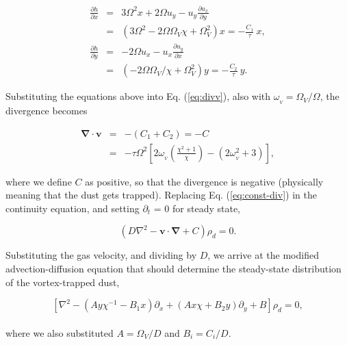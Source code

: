 \documentclass[apj]{emulateapj}
\newcommand{\pderiv}[2]{\frac{\partial #1}{\partial #2}}
\newcommand{\pderivn}[3]{\frac{\partial^{#3} #1}{\partial #2^{#3}}}
\renewcommand{\v}[1]{{\boldsymbol{#1}}} %
\newcommand{\del}{\v{\nabla}}
\newcommand{\Div}{\del\cdot}
\newcommand{\Laplace}{\nabla^2}
\newcommand{\Eq}[1]{Eq. (\ref{#1})}
\newcommand{\eq}[1]{\Eq{#1}}
\newcommand{\beq}{\begin{equation}}
\newcommand{\eeq}{\end{equation}}
\newcommand{\beqn}{\begin{eqnarray}}
\newcommand{\eeqn}{\end{eqnarray}}
\begin{document}
\begin{eqnarray}
\pderiv{h}{x} &=& 3\varOmega^2 x + 2\varOmega u_y -
u_y\pderiv{u_x}{y} \nonumber \\
&=& \left(3\varOmega^2 - 2\Omega\Omega_V \chi + \varOmega_V^2\right) x
= -\frac{C_1}{\tau} \  x,  \\
\pderiv{h}{y} &=& - 2\varOmega u_x -
u_x\pderiv{u_y}{x} \nonumber \\
&=& \left(-2\Omega\Omega_V/\chi + \Omega_V^2\right) y = -\frac{C_2}{\tau} \  y.
\end{eqnarray}

\noindent  Substituting the equations above into \eq{eq:divv}, also
with $\omega_{_V}=\varOmega_V/\varOmega$, the divergence becomes 

\beqn
\Div{\v{v}} &=& -(C_1+C_2) = - C \label{eq:const-div}\\
&=& - \tau\varOmega^2
\left[2\omega_{_V}\left(\frac{\chi^2+1}{\chi}\right) - (2\omega_{_V}^2
  + 3) \right], 
\label{eq:scale-div}
\eeqn

\noindent where we define $C$ as positive, so that the divergence is negative (physically meaning that the dust gets trapped). Replacing \eq{eq:const-div} in the continuity equation, and setting $\partial_t$ =
0 for steady state, 

\beq
\left(D\Laplace{} -  \v{v}\cdot\del  + C\right)\rho_d = 0. 
\label{eq:steady}
\eeq

Substituting the gas velocity, and dividing by $D$, we
arrive at the modified advection-diffusion equation that should
determine the steady-state distribution of the vortex-trapped dust, 




\beq
\left[\Laplace{} - \left(Ay\chi^{-1} - B_1x\right) \partial_x  +
  \left(A x \chi + B_2y\right) \partial_y + B \right] \rho_d   = 0,  
\label{eq:dust-trapping-cartesian}
\eeq
\\
\noindent where we also substituted  $A=\varOmega_V/D$ and $B_i=C_i/D$.
\end{document}
